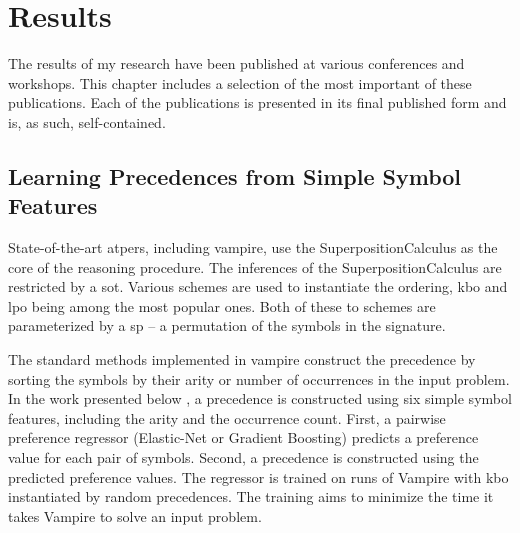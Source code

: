 \newcommand*{\IncludePaper}[2][]{}

\chapter{Results}

The results of my research have been published at various conferences and workshops.
This chapter includes a selection of the most important of these publications.
Each of the publications is presented in its final published form and is, as such, self-contained.


\section{Learning Precedences from Simple Symbol Features}
\label{sec:results:simple}

State-of-the-art \glspl{atper}, including \gls{vampire}, use the \gls{SuperpositionCalculus} as the core of the reasoning procedure.
The inferences of the \gls{SuperpositionCalculus} are restricted by a \gls{sot}.
Various schemes are used to instantiate the ordering,
\gls{kbo} and \gls{lpo} being among the most popular ones.
Both of these \gls{to} schemes are parameterized by a \gls{sp} -- a permutation of the symbols in the signature.

The standard methods implemented in \gls{vampire} construct the \gls{precedence} by sorting the symbols by their arity or number of occurrences in the input problem.
In the work presented below \cite{DBLP:conf/cade/Bartek020},
a \gls{precedence} is constructed using six simple symbol features,
including the arity and the occurrence count.
First, a pairwise preference regressor (Elastic-Net or Gradient Boosting) predicts a preference value for each pair of symbols.
Second, a precedence is constructed using the predicted preference values.
The regressor is trained on runs of Vampire with \gls{kbo} instantiated by random precedences.
The training aims to minimize the time it takes Vampire to solve an input problem.

